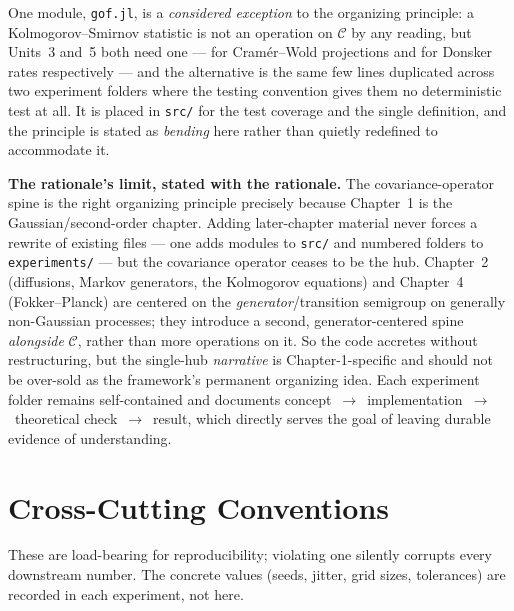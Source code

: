 \documentclass[11pt]{article}
\begin{document}
One module, \texttt{gof.jl}, is a \emph{considered exception} to the organizing principle: a
Kolmogorov--Smirnov statistic is not an operation on $\mathcal{C}$ by any reading, but Units~3 and~5
both need one --- for Cram\'er--Wold projections and for Donsker rates respectively --- and the
alternative is the same few lines duplicated across two experiment folders where the testing
convention gives them no deterministic test at all. It is placed in \texttt{src/} for the test
coverage and the single definition, and the principle is stated as \emph{bending} here rather than
quietly redefined to accommodate it.

\textbf{The rationale's limit, stated with the rationale.} The covariance-operator spine is the right
organizing principle precisely because Chapter~1 is the Gaussian/second-order chapter. Adding
later-chapter material never forces a rewrite of existing files --- one adds modules to \texttt{src/}
and numbered folders to \texttt{experiments/} --- but the covariance operator ceases to be the hub.
Chapter~2 (diffusions, Markov generators, the Kolmogorov equations) and Chapter~4 (Fokker--Planck) are
centered on the \emph{generator}/transition semigroup on generally non-Gaussian processes; they
introduce a second, generator-centered spine \emph{alongside} $\mathcal{C}$, rather than more
operations on it. So the code accretes without restructuring, but the single-hub \emph{narrative} is
Chapter-1-specific and should not be over-sold as the framework's permanent organizing idea. Each
experiment folder remains self-contained and documents concept~$\to$~implementation~$\to$~theoretical
check~$\to$~result, which directly serves the goal of leaving durable evidence of understanding.

\section{Cross-Cutting Conventions}
\label{sec:conv}

These are load-bearing for reproducibility; violating one silently corrupts every downstream number.
The concrete values (seeds, jitter, grid sizes, tolerances) are recorded in each experiment, not here.
\end{document}
